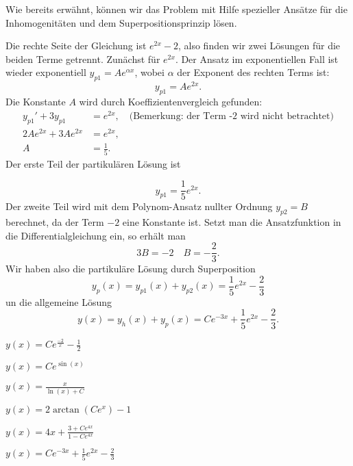 {\begin{itemize}
\begin{iii}
Wie bereits erwähnt, können wir das Problem mit Hilfe spezieller Ansätze für die Inhomogenitäten und dem Superpositionsprinzip lösen.

Die rechte Seite der Gleichung ist $e^{2x} -2$, also finden wir zwei Lösungen für die beiden Terme getrennt. Zunächst für $e^{2x}$. Der Ansatz im exponentiellen Fall ist wieder exponentiell $y_{p1}=Ae^{\alpha x}$, wobei $\alpha$ der Exponent des rechten Terms ist:
$$
y_{p1} = A e^{2x}.
$$
Die Konstante $A$ wird durch Koeffizientenvergleich gefunden:
\begin{align*}
y_{p1}' +3y_{p1} &= e^{2x}, \quad \text{(Bemerkung: der Term -2 wird nicht betrachtet)}\\
2 A e^{2x} + 3 A e^{2x} &= e^{2x},\\
A &= \frac{1}{5}.
\end{align*}
Der erste Teil der partikulären Lösung ist

$$
y_{p1} = \frac{1}{5}e^{2x}.
$$
Der zweite Teil wird mit dem Polynom-Ansatz nullter Ordnung $y_{p2}=B$ berechnet, da der Term $-2$ eine Konstante ist. Setzt man die Ansatzfunktion in die Differentialgleichung ein, so erhält man
$$
3 B = -2 \quad B=-\frac{2}{3}.
$$
Wir haben also die partikuläre Lösung durch Superposition
$$
y_p(x) = y_{p1}(x) + y_{p2}(x) =  \frac{1}{5}e^{2x} - \frac{2}{3}
$$
un die allgemeine Lösung
$$
y(x) = y_h(x) + y_p(x) = Ce^{-3x} +  \frac{1}{5}e^{2x} - \frac{2}{3}.
$$
\end{iii}

\end{itemize}
}



{
\begin{iii}
\item $y(x) = C e^\frac{-2}{x} - \frac{1}{2}$
\item $y(x) = C e^{\sin(x)}$
\item $y(x) = \frac{x}{\ln(x) + C}$
\item $y(x) = 2\arctan(Ce^x)-1$
\item $y(x) = 4x + \frac{3+Ce^{4x}}{1-Ce^{4x}}$
\item $y(x)= Ce^{-3x} +  \frac{1}{5}e^{2x} - \frac{2}{3}$
\end{iii}
}